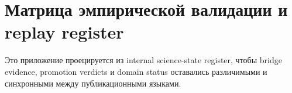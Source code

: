 \section{Матрица эмпирической валидации и replay register}
\label{sec:oc-core-1-3-empirical-validation-matrix-ru}
\label{sec:oc-core-1-3-empirical-validation-matrix}

Это приложение проецируется из internal science-state register, чтобы bridge evidence,
promotion verdicts и domain status оставались различимыми и синхронными между
публикационными языками.

\begingroup
\footnotesize
\RaggedRight
\sloppy
\setlength{\tabcolsep}{2pt}
\setlength{\LTleft}{0pt}
\setlength{\LTright}{0pt}

\endgroup
